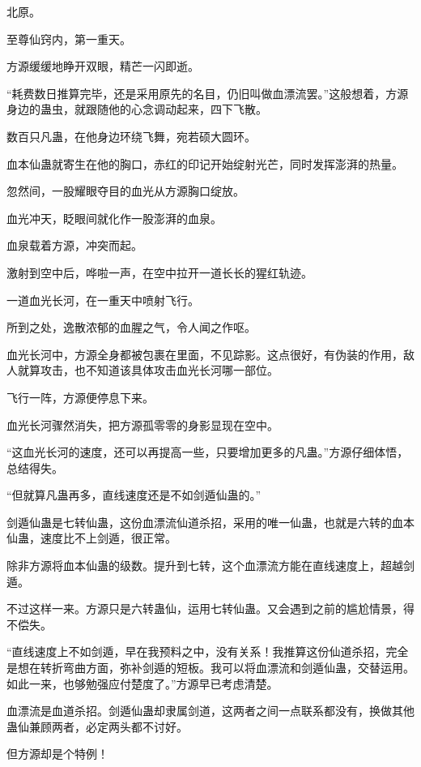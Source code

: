 
\begin{this_body}

北原。

至尊仙窍内，第一重天。

方源缓缓地睁开双眼，精芒一闪即逝。

“耗费数日推算完毕，还是采用原先的名目，仍旧叫做血漂流罢。”这般想着，方源身边的蛊虫，就跟随他的心念调动起来，四下飞散。

数百只凡蛊，在他身边环绕飞舞，宛若硕大圆环。

血本仙蛊就寄生在他的胸口，赤红的印记开始绽射光芒，同时发挥澎湃的热量。

忽然间，一股耀眼夺目的血光从方源胸口绽放。

血光冲天，眨眼间就化作一股澎湃的血泉。

血泉载着方源，冲突而起。

激射到空中后，哗啦一声，在空中拉开一道长长的猩红轨迹。

一道血光长河，在一重天中喷射飞行。

所到之处，逸散浓郁的血腥之气，令人闻之作呕。

血光长河中，方源全身都被包裹在里面，不见踪影。这点很好，有伪装的作用，敌人就算攻击，也不知道该具体攻击血光长河哪一部位。

飞行一阵，方源便停息下来。

血光长河骤然消失，把方源孤零零的身影显现在空中。

“这血光长河的速度，还可以再提高一些，只要增加更多的凡蛊。”方源仔细体悟，总结得失。

“但就算凡蛊再多，直线速度还是不如剑遁仙蛊的。”

剑遁仙蛊是七转仙蛊，这份血漂流仙道杀招，采用的唯一仙蛊，也就是六转的血本仙蛊，速度比不上剑遁，很正常。

除非方源将血本仙蛊的级数。提升到七转，这个血漂流方能在直线速度上，超越剑遁。

不过这样一来。方源只是六转蛊仙，运用七转仙蛊。又会遇到之前的尴尬情景，得不偿失。

“直线速度上不如剑遁，早在我预料之中，没有关系！我推算这份仙道杀招，完全是想在转折弯曲方面，弥补剑遁的短板。我可以将血漂流和剑遁仙蛊，交替运用。如此一来，也够勉强应付楚度了。”方源早已考虑清楚。

血漂流是血道杀招。剑遁仙蛊却隶属剑道，这两者之间一点联系都没有，换做其他蛊仙兼顾两者，必定两头都不讨好。

但方源却是个特例！


\end{this_body}
